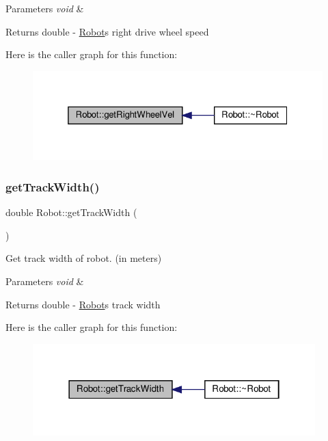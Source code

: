 \begin{DoxyParams}{Parameters}
{\em void} & \\
\hline
\end{DoxyParams}
\begin{DoxyReturn}{Returns}
double -\/ \hyperlink{classRobot}{Robot}\textquotesingle{}s right drive wheel speed 
\end{DoxyReturn}
Here is the caller graph for this function\+:
\nopagebreak
\begin{figure}[H]
\begin{center}
\leavevmode
\includegraphics[width=325pt]{classRobot_a4596767fd5ee2f6a923523a298d584fb_icgraph}
\end{center}
\end{figure}
\mbox{\label{classRobot_a4a8df828fb337ab4505f3513bd46f410}} 
\subsubsection{\texorpdfstring{get\+Track\+Width()}{getTrackWidth()}}
{\footnotesize\ttfamily double Robot\+::get\+Track\+Width (\begin{DoxyParamCaption}{ }\end{DoxyParamCaption})}



Get track width of robot. (in meters) 


\begin{DoxyParams}{Parameters}
{\em void} & \\
\hline
\end{DoxyParams}
\begin{DoxyReturn}{Returns}
double -\/ \hyperlink{classRobot}{Robot}\textquotesingle{}s track width 
\end{DoxyReturn}
Here is the caller graph for this function\+:
\nopagebreak
\begin{figure}[H]
\begin{center}
\leavevmode
\includegraphics[width=310pt]{classRobot_a4a8df828fb337ab4505f3513bd46f410_icgraph}
\end{center}
\end{figure}
\mbox{\label{classRobot_a31e2ab259ea221e1143141ee7765a8e2}} 
